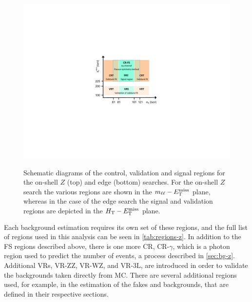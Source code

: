 \begin{figure}[h]
\centering
\includegraphics[width=.8\textwidth]{figures/fs/FSdiagram_v2.pdf}\\
\caption{
Schematic diagrams of the control, validation and signal regions for the on-shell $Z$ (top) and edge (bottom) searches.
For the on-shell $Z$ search the various regions are shown in the $m_{\ell\ell}-E_{\text{T}}^{\text{miss}}$ plane, whereas in the case of the edge search the
signal and validation regions are depicted in the $H_{\text{T}}-E_{\text{T}}^{\text{miss}}$ plane.
\label{fig:region_diagrams}
}
\end{figure}

Each background estimation requires its own set of these regions, and the full list of regions used in this analysis can be seen in \autoref{tab:regions-z}. In addition to the \acf{FS} regions described above, there is one more \ac{CR}, CR-$\gamma$, which is a photon region used to predict the number of \dyjets events, a process described in \autoref{sec:bg-z}. Additional \acp{VR}, VR-ZZ, VR-WZ, and VR-3L, are introduced in order to validate the backgrounds taken directly from \ac{MC}. There are several additional regions used, for example, in the estimation of the fakes and \dyjets backgrounds, that are defined in their respective sections. 

